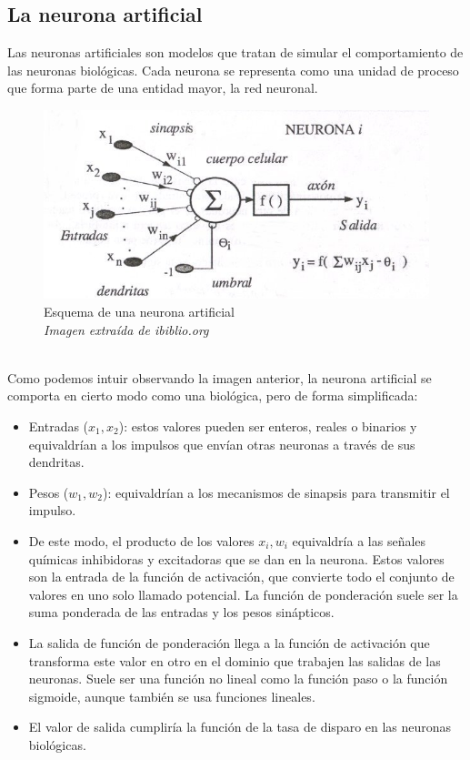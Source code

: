 \subsection {La neurona artificial} \mbox{}
Las neuronas artificiales son modelos que tratan de simular el comportamiento de las neuronas biológicas. Cada neurona se representa como una unidad de proceso que forma parte de una entidad mayor, la red neuronal.
\begin{figure}[htp]
\centering
\includegraphics[scale=1]{images/neuronaartificial.jpg}
\caption{Esquema de una neurona artificial\\\textit{Imagen extraída de ibiblio.org}}
\end{figure}\\
Como podemos intuir observando la imagen anterior, la neurona artificial se comporta en cierto modo como una biológica, pero de forma simplificada:
\begin{itemize}
\item Entradas (${x_{1}, x_{2}}$): estos valores pueden ser enteros, reales o binarios y equivaldrían a los impulsos que envían otras neuronas a través de sus dendritas.
\item Pesos (${w_{1}, w_{2}}$): equivaldrían a los mecanismos de sinapsis para transmitir el impulso.
\item De este modo, el producto de los valores ${x_{i} , w_{i}}$ equivaldría a las señales químicas inhibidoras y excitadoras que se dan en la neurona. Estos valores son la entrada de la función de activación, que convierte todo el conjunto de valores en uno solo llamado potencial. La función de ponderación suele ser la suma ponderada de las entradas y los pesos sinápticos.
\item La salida de función de ponderación llega a la función de activación que transforma este valor en otro en el dominio que trabajen las salidas de las neuronas. Suele ser una función no lineal como la función paso o la función sigmoide, aunque también se usa funciones lineales.
\item El valor de salida cumpliría la función de la tasa de disparo en las neuronas biológicas.
\end{itemize}
